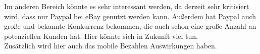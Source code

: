 Im anderen Bereich könnte es sehr interessant werden, da derzeit sehr kritisiert wird, dass nur Paypal bei eBay genutzt werden kann. Außerdem hat Paypal auch große und bekannte Konkurrenz bekommen, die auch schon eine große Anzahl an potenziellen Kunden hat. Hier könnte sich in Zukunft viel tun.\\

Zusätzlich wird hier auch das mobile Bezahlen Auswirkungen haben.
